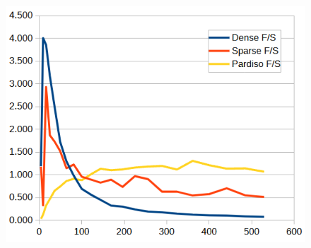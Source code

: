 \documentclass[letterpaper, 10 pt, conference]{ieeeconf}  %
\begin{document}
\begin{figure}
\begin{minipage}[b]{.45\linewidth}
         \label{fig:ratios}
        \end{minipage}\hfill
        \begin{minipage}[b]{.45\linewidth}
                \centering
                \includegraphics[width=1.0\linewidth]{ratios.png}
                 \label{fig:ratiosgraph}
        \end{minipage}
\end{figure}
\end{document}
